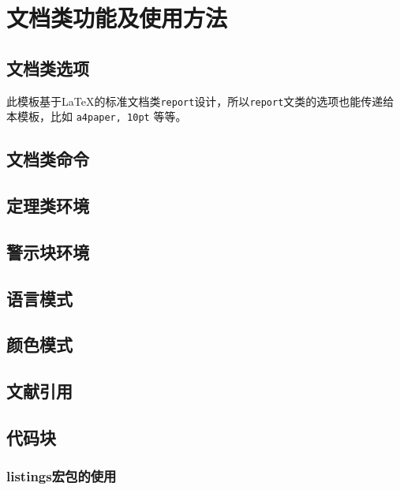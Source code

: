 \documentclass[12pt, green, textbook]{uglyrep}
\begin{document}
\chapter{文档类功能及使用方法}
\section{文档类选项}\label{ssec:classoptions}

此模板基于\LaTeX{}的标准文档类\texttt{report}设计，所以\texttt{report}文类的选项也能传递给本模板，比如 \texttt{a4paper, 10pt} 等等。



\section{文档类命令}


\section{定理类环境}


\section{警示块环境}


\section{语言模式}


\section{颜色模式}\label{ssec:colors}


\section{文献引用}


\section{代码块}


\subsection{listings宏包的使用}

\end{document}
